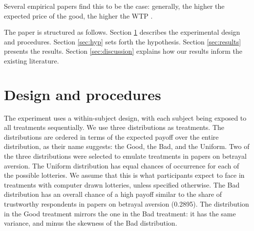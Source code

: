 Several empirical papers find this to be the case: generally, the higher the expected price of the good, the higher the WTP \citep[for a short review of this literature, see][]{Tymula2016}.

The paper is structured as follows.
Section \ref{sec:proced} describes the experimental design and procedures.
Section \ref{sec:hyp} sets forth the hypothesis.
Section \ref{sec:results} presents the results.
Section \ref{sec:discussion} explains how our results inform the existing literature.


\section{Design and procedures}\label{sec:proced}
The experiment uses a within-subject design, with each subject being exposed to all treatments sequentially.
We use three distributions as treatments.
The distributions are ordered in terms of the expected payoff over the entire distribution, as their name suggests: the Good, the Bad, and the Uniform.
Two of the three distributions were selected to emulate treatments in papers on betrayal aversion.
The Uniform distribution has equal chances of occurrence for each of the possible lotteries.
We assume that this is what participants expect to face in treatments with computer drawn lotteries, unless specified otherwise.
The Bad distribution has an overall chance of a high payoff similar to the share of trustworthy respondents in papers on betrayal aversion (0.2895).
The distribution in the Good treatment mirrors the one in the Bad treatment: it has the same variance, and minus the skewness of the Bad distribution.

